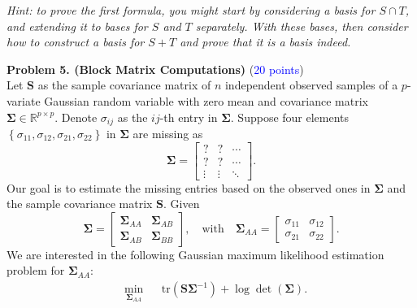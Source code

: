 \documentclass[english,onecolumn]{IEEEtran}
\begin{document}
\noindent\textit{Hint: to prove the first formula, you might start by considering a basis for $S\cap T$, and extending it to bases for $S$ and $T$ separately. With these bases, then consider how to construct a basis for $S+T$ and prove that it is a basis indeed.}
\newpage

\noindent \textbf{Problem 5. (Block Matrix Computations) } (\textcolor{blue}{20 points}) \\ Let $\mathbf{S}$
as the sample covariance matrix of $n$ independent observed samples
of a $p$-variate Gaussian random variable with zero mean and covariance
matrix $\bm{\Sigma}\in\mathbb{R}^{p\times p}$. Denote $\sigma_{ij}$
as the $ij$-th entry in $\bm{\Sigma}$. Suppose four elements $\left\{ \sigma_{11},\sigma_{12},\sigma_{21},\sigma_{22}\right\} $
in $\bm{\Sigma}$ are missing as
\[
\bm{\Sigma}=\left[\begin{array}{ccc}
? & ? & \cdots\\
? & ? & \cdots\\
\vdots & \vdots & \ddots
\end{array}\right].
\]
Our goal is to estimate the missing entries based on the observed
ones in $\boldsymbol{\Sigma}$ and the sample covariance matrix $\mathbf{S}$.
Given
\[
\bm{\Sigma}=\left[\begin{array}{cc}
\boldsymbol{\Sigma}_{AA} & \boldsymbol{\Sigma}_{AB}\\
\boldsymbol{\Sigma}_{AB} & \boldsymbol{\Sigma}_{BB}
\end{array}\right],\quad\text{with}\quad\boldsymbol{\Sigma}_{AA}=\left[\begin{array}{cc}
\sigma_{11} & \sigma_{12}\\
\sigma_{21} & \sigma_{22}
\end{array}\right].
\]
We are interested in the following Gaussian maximum likelihood estimation
problem for $\boldsymbol{\Sigma}_{AA}$:
\begin{equation}
\begin{aligned} & \underset{\boldsymbol{\Sigma}_{AA}}{\min} &  & \mathrm{tr}\left(\mathbf{S}\bm{\Sigma}^{-1}\right)+\log\det\left(\bm{\Sigma}\right).\end{aligned}
\label{eq:nonnegative-CE}
\end{equation}
\end{document}

